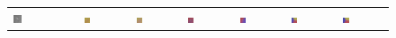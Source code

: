 \begin{figure}[h!]
	\setlength\tabcolsep{1pt}
	\def\arraystretch{0.5}
	\begin{tabular}{C{0.14\textwidth}C{0.14\textwidth}C{0.14\textwidth}C{0.14\textwidth}C{0.14\textwidth}C{0.14\textwidth}C{0.14\textwidth}}
		\includegraphics[width=0.14\textwidth]{images/p03/p03_01.png} &
		\includegraphics[width=0.14\textwidth]{images/gen/spatial_weight/p03_01.png_0.00.png} &
		\includegraphics[width=0.14\textwidth]{images/gen/spatial_weight/p03_01.png_0.33.png} &
		\includegraphics[width=0.14\textwidth]{images/gen/spatial_weight/p03_01.png_0.66.png} &
		\includegraphics[width=0.14\textwidth]{images/gen/spatial_weight/p03_01.png_1.00.png} &
		\includegraphics[width=0.14\textwidth]{images/gen/spatial_weight/p03_01.png_1.33.png} &
		\includegraphics[width=0.14\textwidth]{images/gen/spatial_weight/p03_01.png_1.66.png} \\

\end{tabular}
\end{figure}
